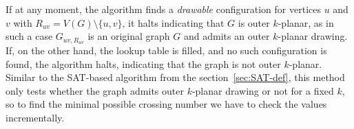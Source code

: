If at any moment, the algorithm finds a \emph{drawable} configuration for vertices \(u\) and \(v\) with \(R_{uv} = V(G)\setminus\{u, v\}\), it halts indicating that \(G\) is outer \(k\)-planar, as in such a case \(G_{uv, R_{uv}}\) is an original graph \(G\) and admits an outer \(k\)-planar drawing. If, on the other hand, the lookup table is filled, and no such configuration is found, the algorithm halts, indicating that the graph is not outer \(k\)-planar. Similar to the SAT-based algorithm from the section~\ref{sec:SAT-def}, this method only tests whether the graph admits outer \(k\)-planar drawing or not for a fixed \(k\), so to find the minimal possible crossing number we have to check the values incrementally.
